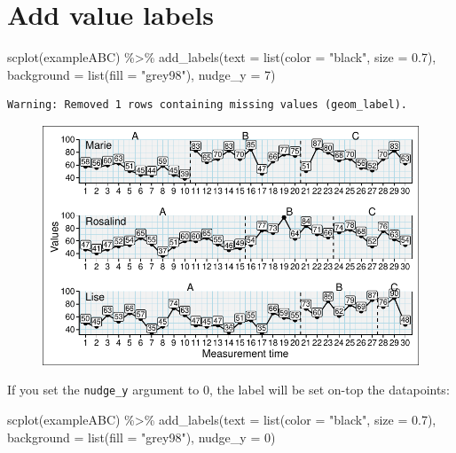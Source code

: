 \documentclass[
  letterpaper,
  DIV=11,
  numbers=noendperiod]{scrreprt}
\newenvironment{Shaded}{\begin{snugshade}}{\end{snugshade}}
\newcommand{\AttributeTok}[1]{\textcolor[rgb]{0.40,0.45,0.13}{#1}}
\newcommand{\DecValTok}[1]{\textcolor[rgb]{0.68,0.00,0.00}{#1}}
\newcommand{\FloatTok}[1]{\textcolor[rgb]{0.68,0.00,0.00}{#1}}
\newcommand{\FunctionTok}[1]{\textcolor[rgb]{0.28,0.35,0.67}{#1}}
\newcommand{\NormalTok}[1]{\textcolor[rgb]{0.00,0.23,0.31}{#1}}
\newcommand{\SpecialCharTok}[1]{\textcolor[rgb]{0.37,0.37,0.37}{#1}}
\newcommand{\StringTok}[1]{\textcolor[rgb]{0.13,0.47,0.30}{#1}}
\begin{document}
\hypertarget{add-value-labels}{%
\section{Add value labels}\label{add-value-labels}}

\begin{Shaded}
\begin{Highlighting}[]
\FunctionTok{scplot}\NormalTok{(exampleABC) }\SpecialCharTok{\%\textgreater{}\%} 
  \FunctionTok{add\_labels}\NormalTok{(}\AttributeTok{text =} \FunctionTok{list}\NormalTok{(}\AttributeTok{color =} \StringTok{"black"}\NormalTok{, }\AttributeTok{size =} \FloatTok{0.7}\NormalTok{), }
             \AttributeTok{background =} \FunctionTok{list}\NormalTok{(}\AttributeTok{fill =} \StringTok{"grey98"}\NormalTok{), }\AttributeTok{nudge\_y =} \DecValTok{7}\NormalTok{)}
\end{Highlighting}
\end{Shaded}

\begin{verbatim}
Warning: Removed 1 rows containing missing values (geom_label).
\end{verbatim}

\begin{figure}[H]

{\centering \includegraphics{./ch_scplot_files/figure-pdf/valuelabels1-1.pdf}

}

\end{figure}

If you set the \texttt{nudge\_y} argument to 0, the label will be set
on-top the datapoints:

\begin{Shaded}
\begin{Highlighting}[]
\FunctionTok{scplot}\NormalTok{(exampleABC) }\SpecialCharTok{\%\textgreater{}\%} 
  \FunctionTok{add\_labels}\NormalTok{(}\AttributeTok{text =} \FunctionTok{list}\NormalTok{(}\AttributeTok{color =} \StringTok{"black"}\NormalTok{, }\AttributeTok{size =} \FloatTok{0.7}\NormalTok{), }
             \AttributeTok{background =} \FunctionTok{list}\NormalTok{(}\AttributeTok{fill =} \StringTok{"grey98"}\NormalTok{), }\AttributeTok{nudge\_y =} \DecValTok{0}\NormalTok{)}
\end{Highlighting}
\end{Shaded}
\end{document}

